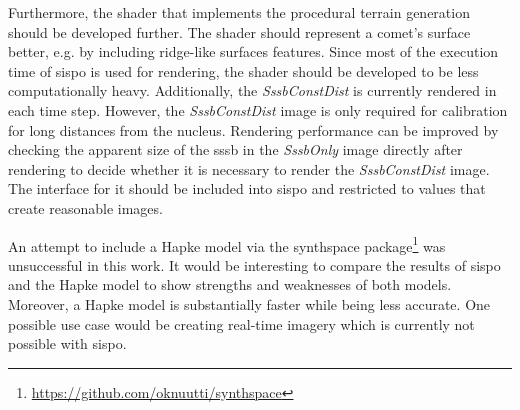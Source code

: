 Furthermore, the shader that implements the procedural terrain generation should be developed further. The shader should represent a comet's surface better, e.g. by including ridge-like surfaces features. Since most of the execution time of \gls{sispo} is used for rendering, the shader should be developed to be less computationally heavy. Additionally, the \textit{SssbConstDist} is currently rendered in each time step. However, the \textit{SssbConstDist} image is only required for calibration for long distances from the nucleus. Rendering performance can be improved by checking the apparent size of the \gls{sssb} in the \textit{SssbOnly} image directly after rendering to decide whether it is necessary to render the \textit{SssbConstDist} image.  The interface for it should be included into \gls{sispo} and restricted to values that create reasonable images.

An attempt to include a Hapke model via the synthspace package\footnote{\url{https://github.com/oknuutti/synthspace}} was unsuccessful in this work. It would be interesting to compare the results of \gls{sispo} and the Hapke model to show strengths and weaknesses of both models. Moreover, a Hapke model is substantially faster while being less accurate. One possible use case would be creating real-time imagery which is currently not possible with \gls{sispo}.